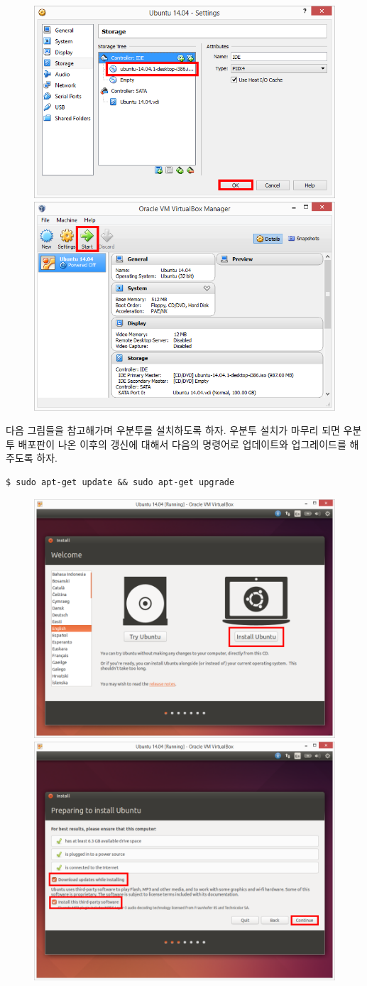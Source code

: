 \begin{figure}[h]
\centering
\includegraphics[width=0.49\columnwidth]{pictures/chapter3/vm15.png}
\includegraphics[width=0.49\columnwidth]{pictures/chapter3/vm16.png}
\end{figure}

\newpage

\noindent
다음 그림들을 참고해가며 우분투를 설치하도록 하자. 우분투 설치가 마무리 되면 우분투 배포판이 나온 이후의 갱신에 대해서 다음의 명령어로 업데이트와 업그레이드를 해주도록 하자.

\vspace{\baselineskip}
\begin{lstlisting}[language=ROS]
$ sudo apt-get update && sudo apt-get upgrade
\end{lstlisting}

\begin{figure}[h]
\centering
\includegraphics[width=0.45\columnwidth]{pictures/chapter3/vm17.png}
\includegraphics[width=0.45\columnwidth]{pictures/chapter3/vm18.png}
\end{figure}

